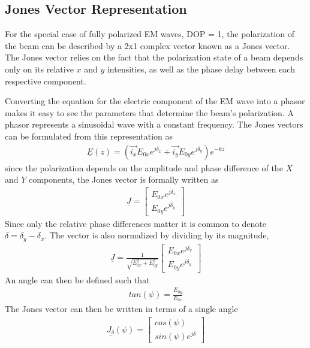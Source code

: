 \subsection{Jones Vector Representation}
For the special case of fully polarized EM waves, DOP = 1, the polarization of the beam can be described by a 2x1 complex vector known as a Jones vector.  The Jones vector relies on the fact that the polarization state of a beam depends only on its relative $x$ and $y$ intensities, as well as the phase delay between each respective component.

Converting the equation for the electric component of the EM wave into a phasor makes it easy to see the parameters that determine the beam's polarization.  A phasor represents a sinusoidal wave with a constant frequency.  The Jones vectors can be formulated from this representation as
%
\begin{align}
    \underline{\hat{E}}(z)=(\vec{i_x} E_{0x} e^{j\delta_x}+\vec{i_y} E_{0y} e^{j\delta_y })e^{-kz}
\end{align}
%
since the polarization depends on the amplitude and phase difference of the $X$ and $Y$ components, the Jones vector is formally written as
%
\begin{align}
    \underline{J} =
    \begin{bmatrix}
        E_{0x} e^{j\delta_x} \\
        E_{0y} e^{j\delta_y }
    \end{bmatrix}
\end{align}
%
Since only the relative phase differences matter it is common to denote $\delta=\delta_y-\delta_x$.  The vector is also normalized by dividing by its magnitude,
%
\begin{align}
    \underline{J} =
    \frac{1}{\sqrt{E_{0x}^2 + E_{0y}^2}}
    \begin{bmatrix}
        E_{0x} e^{j\delta_x} \\
        E_{0y} e^{j\delta_y }
    \end{bmatrix}
\end{align}
%
An angle can then be defined such that
%
\begin{align}
    tan(\psi) = \frac{E_{0y}}{E_{0x}}
\end{align}
%
The Jones vector can then be written in terms of a single angle
%
\begin{align}
    \underline{J_{\delta}}(\psi) =
    \begin{bmatrix}
        cos(\psi) \\
        sin(\psi)e^{j\delta}
    \end{bmatrix}
\end{align}
